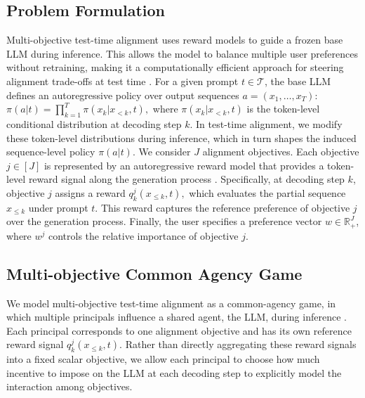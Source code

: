 \documentclass{article}
\begin{document}
\subsection{Problem Formulation}
Multi-objective test-time alignment uses reward models to guide a frozen base LLM during inference. This allows the model to balance multiple user preferences without retraining, making it a computationally efficient approach for steering alignment trade-offs at test time \citep{xu2024genarm,lin2025parm}.
For a given prompt \(t \in \mathcal{T}\), the base LLM defines an autoregressive policy over output sequences \(a=(x_1,\dots,x_T)\):
\(
\pi(a | t)=\prod_{k=1}^T \pi(x_k | x_{<k},t),
\)
where \(\pi(x_k | x_{<k},t)\) is the token-level conditional distribution at decoding step \(k\). In test-time alignment, we modify these token-level distributions during inference, which in turn shapes the induced sequence-level policy \(\pi(a | t)\).
We consider \(J\) alignment objectives. Each objective \(j \in [J]\) is represented by an autoregressive reward model that provides a token-level reward signal along the generation process \citep{xu2024genarm,lin2025parm}. Specifically, at decoding step \(k\), objective \(j\) assigns a reward
\(
q_k^j(x_{\le k}, t),
\)
which evaluates the partial sequence \(x_{\le k}\) under prompt \(t\). This reward captures the reference preference of objective \(j\) over the generation process. Finally, the user specifies a preference vector \(w \in \mathbb{R}_+^J\), where \(w^j\) controls the relative importance of objective \(j\).

\subsection{Multi-objective Common Agency Game}
We model multi-objective test-time alignment as a common-agency game, in which multiple principals influence a shared agent, the LLM, during inference \citep{bernheim1986common}. Each principal corresponds to one alignment objective and has its own reference reward signal \(q_k^j(x_{\le k}, t)\). Rather than directly aggregating these reward signals into a fixed scalar objective, we allow each principal to choose how much incentive to impose on the LLM at each decoding step to explicitly model the interaction among objectives.

\end{document}
